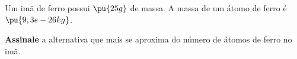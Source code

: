 Um imã de ferro possui \(\pu{25 g}\) de massa. A massa de um átomo de ferro é \(\pu{9,3e-26 kg}\).

\textbf{Assinale} a alternativa que mais se aproxima do número de átomos de ferro no imã.